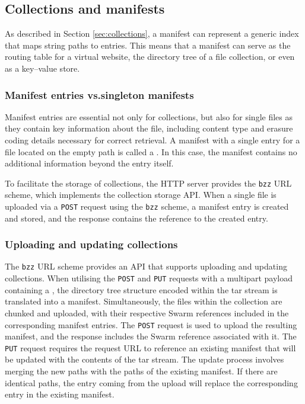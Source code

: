 \subsection{Collections and manifests \statusgreen}\label{sec:manifests-ux}

As described in Section \ref{sec:collections}, a manifest can represent a generic index that maps string paths to entries. This means that a manifest can serve as the routing table for a virtual website, the directory tree of a file collection, or even as a key--value store. 

\subsubsection{Manifest entries vs.singleton manifests}

Manifest entries are essential not only for collections, but also for single files as they contain key information about the file, including content type and erasure coding details necessary for correct retrieval. A manifest with a single entry for a file located on the empty path is called a . In this case, the manifest contains no additional information beyond the entry itself.  

To facilitate the storage of collections, the HTTP server provides the \lstinline{bzz} URL scheme, which implements the collection storage API. When a single file is uploaded via a \lstinline{POST} request using the \lstinline{bzz} scheme, a manifest entry is created and stored, and the response contains the reference to the created entry.

\subsubsection{Uploading and updating collections}

The \lstinline{bzz} URL scheme provides an API that supports uploading and updating collections. When utilising the \lstinline{POST} and \lstinline{PUT} requests with a multipart payload containing a , the directory tree structure encoded within the tar stream is translated into a manifest. Simultaneously, the files within the collection are chunked and uploaded, with their respective Swarm references included in the corresponding manifest entries. The \lstinline{POST} request is used to upload the resulting manifest, and the response includes the Swarm reference associated with it. The \lstinline{PUT} request requires the request URL to reference an existing manifest that will be updated with the contents of the tar stream. The update process involves merging the new paths with the paths of the existing manifest. If there are identical paths, the entry coming from the upload will replace the corresponding entry in the existing manifest.


